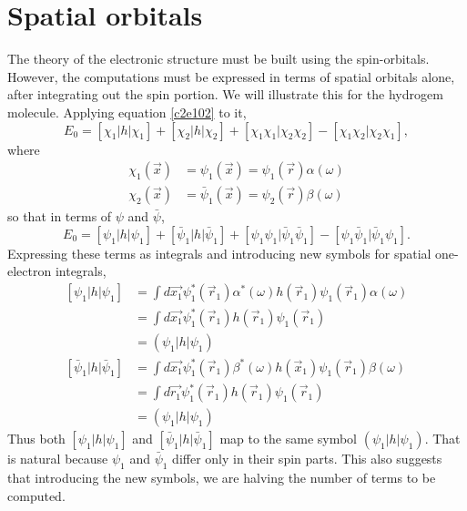 \section{Spatial orbitals}
The theory of the electronic structure must be built using the spin-orbitals.
However, the computations must be expressed in terms of spatial orbitals alone,
after integrating out the spin portion. We will illustrate this for the hydrogem
molecule. Applying equation \eqref{c2e102} to it,
\[
E_0 = [\chi_1|h|\chi_1] + [\chi_2|h|\chi_2] + [\chi_1\chi_1|\chi_2\chi_2] -
[\chi_1\chi_2|\chi_2\chi_1],
\]
where
\[
\begin{aligned}
\chi_1(\vec{x}) &= \psi_1(\vec{x}) = \psi_1(\vec{r})\alpha(\omega) \\
\chi_2(\vec{x}) &= \bar{\psi}_1(\vec{x}) = \psi_2(\vec{r})\beta(\omega)
\end{aligned}
\]
so that in terms of $\psi$ and $\bar{\psi}$,
\[
E_0 = [\psi_1|h|\psi_1] + [\bar{\psi}_1|h|\bar{\psi}_1] + 
[\psi_1\psi_1|\bar{\psi}_1\bar{\psi}_1]-[\psi_1\bar{\psi}_1|\bar{\psi}_1\psi_1].
\]
Expressing these terms as integrals and introducing new symbols for spatial
one-electron integrals,
\begin{equation}\label{c2e103}
\begin{aligned}
[\psi_1|h|\psi_1] &= \int d\vec{x_1}\psi_1^\ast(\vec{r}_1)\alpha^\ast(\omega)
  h(\vec{r}_1)\psi_1(\vec{r}_1)\alpha(\omega) \\
 &= \int d\vec{x_1}\psi_1^\ast(\vec{r}_1) h(\vec{r}_1)\psi_1(\vec{r}_1) \\
 &= (\psi_1|h|\psi_1) \\
[\bar{\psi}_1|h|\bar{\psi}_1] &= \int d\vec{x_1}\psi_1^\ast(\vec{r}_1)
 \beta^\ast(\omega)h(\vec{x}_1)\psi_1(\vec{r}_1)\beta(\omega) \\
 &= \int d\vec{r_1}\psi_1^\ast(\vec{r}_1) h(\vec{r}_1)\psi_1(\vec{r}_1) \\
 &= (\psi_1|h|\psi_1) 
\end{aligned}
\end{equation}
Thus both $[\psi_1|h|\psi_1]$ and $[\bar{\psi}_1|h|\bar{\psi}_1]$ map to the
same symbol $(\psi_1|h|\psi_1)$. That is natural because $\psi_1$ and 
$\bar{\psi}_1$ differ only in their spin parts. This also suggests that 
introducing the new symbols, we are halving the number of terms to be computed.

